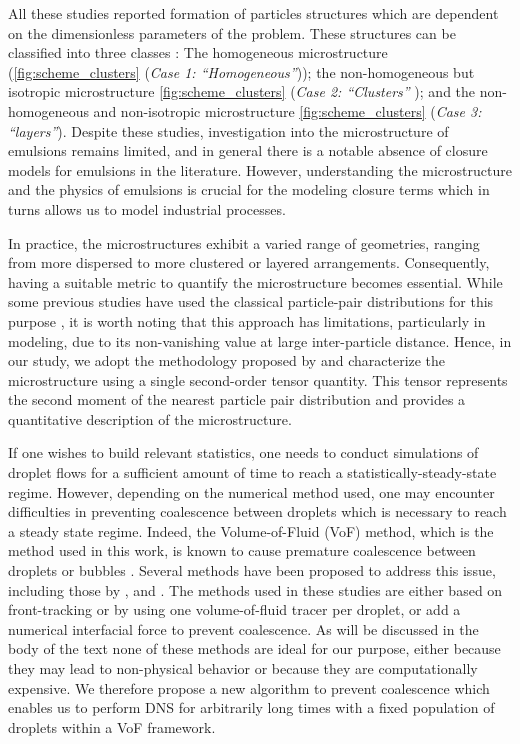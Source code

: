 All these studies reported formation of particles structures which are dependent on the dimensionless parameters of the problem. 
These structures can be classified into three classes : The homogeneous microstructure (\ref{fig:scheme_clusters} (\textit{Case 1: ``Homogeneous''})); the non-homogeneous but isotropic microstructure \ref{fig:scheme_clusters} (\textit{Case 2: ``Clusters'' }); and the non-homogeneous and non-isotropic microstructure \ref{fig:scheme_clusters} (\textit{Case 3: ``layers''}). 
Despite these studies, investigation into the microstructure of emulsions remains limited, and in general there is a notable absence of closure models for emulsions in the literature.  
However, understanding the microstructure and the physics of emulsions is crucial for the modeling closure terms which in turns allows us to model industrial processes. 

In practice, the microstructures exhibit a varied range of geometries, ranging from more dispersed to more clustered or layered arrangements. 
Consequently, having a suitable metric to quantify the microstructure becomes essential. 
While some previous studies have used the classical particle-pair distributions for this purpose \citep{yin2007,seyed2021sedimentation}, it is worth noting that this approach has limitations, particularly in modeling, due to its non-vanishing value at large inter-particle distance. 
Hence, in our study, we adopt the methodology proposed by \citet{zhang2023evolution} and characterize the microstructure using a single second-order tensor quantity. 
This tensor represents the second moment of the nearest particle pair distribution and provides a quantitative description of the microstructure.

If one wishes to build relevant statistics, one needs to conduct simulations of droplet flows for a sufficient amount of time to reach a statistically-steady-state regime. 
However, depending on the numerical method used, one may encounter difficulties in preventing coalescence between droplets which is necessary to reach a steady state regime. 
Indeed, the Volume-of-Fluid (VoF) method, which is the method used in this work, is known to cause premature coalescence between droplets or bubbles \citep{innocenti2020direct}.
Several methods have been proposed to address this issue, including those by \citet{roghair2011drag,balcazar2015multiple,hidman2023assessing,zhang2023evolution}, and \citet{karnakov2022computing}. 
The methods used in these studies are either based on front-tracking or by using one volume-of-fluid tracer per droplet, or add a numerical interfacial force to prevent coalescence. 
As will be discussed in the body of the text none of these methods are ideal for our purpose, either because they may lead to non-physical behavior or because they are computationally expensive. 
We therefore propose a new algorithm to prevent coalescence which enables us to perform DNS for arbitrarily long times with a fixed population of droplets within a VoF framework.

